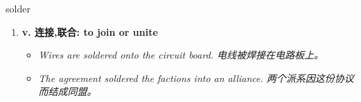 
\begin{frame}
{\huge solder}
\begin{center}
\begin{enumerate}\Large
  \item \textbf{v. 连接,联合: to join or unite}
  \begin{itemize}
    \item \em{\Large{Wires are soldered onto the circuit board. 电线被焊接在电路板上。}}
    \item \em{\Large{The agreement soldered the factions into an alliance. 两个派系因这份协议而结成同盟。}}
  \end{itemize}
\end{enumerate}
\end{center}
\end{frame}
